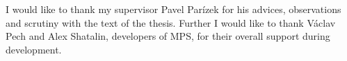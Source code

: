 I would like to thank my supervisor Pavel Parízek for his advices, observations
and scrutiny with the text of the thesis.
Further I would like to thank Václav Pech and Alex Shatalin, developers of MPS, for their overall support during development.